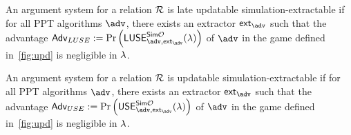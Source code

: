 \begin{definition}\label{late-use}
	An argument system for a relation $\mathcal{R}$ is late updatable simulation-extractable if for all PPT algorithms $\adv$, there exists an extractor $\ext_{\adv}$ such that the advantage $\Adv_{LUSE}:=\Pr \left( \mathsf{LUSE}^{\simO}_{\adv,\ext_{\adv}}(\secp)\right)$ of $\adv$ in the game defined in~\cref{fig:upd} is negligible in $\lambda$.
\end{definition}

\begin{definition}\label{USE}
	An argument system for a relation $\mathcal{R}$ is updatable simulation-extractable if for all PPT algorithms $\adv$, there exists an extractor $\ext_{\adv}$ such that the advantage $\Adv_{USE} := \Pr \left( \mathsf{USE}^{\simO}_{\adv,\ext_{\adv}}(\secp)\right)$ of $\adv$ in the game defined in~\cref{fig:upd} is negligible in $\lambda$.
\end{definition}

